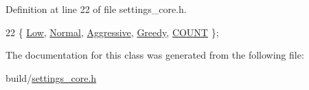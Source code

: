 Definition at line 22 of file settings\+\_\+core.\+h.


\begin{DoxyCode}
22 \{ \hyperlink{classOkular_1_1SettingsCore_1_1EnumMemoryLevel_a6dcad4c36c335a5cab78f24dd88090b4aa61e4f07eed0bf070a41fb0998e8c3b5}{Low}, \hyperlink{classOkular_1_1SettingsCore_1_1EnumMemoryLevel_a6dcad4c36c335a5cab78f24dd88090b4aab69bfc6de34e8bf9634a7586486296a}{Normal}, \hyperlink{classOkular_1_1SettingsCore_1_1EnumMemoryLevel_a6dcad4c36c335a5cab78f24dd88090b4a5f4aefbf160a235d1c3219eeca91f898}{Aggressive}, \hyperlink{classOkular_1_1SettingsCore_1_1EnumMemoryLevel_a6dcad4c36c335a5cab78f24dd88090b4a0c192fe00a744fb84cbc63d9431fbe2a}{Greedy}, \hyperlink{classOkular_1_1SettingsCore_1_1EnumMemoryLevel_a6dcad4c36c335a5cab78f24dd88090b4a9f4d6aa58e26f00075b19021d2590a40}{COUNT} \};
\end{DoxyCode}


The documentation for this class was generated from the following file\+:\begin{DoxyCompactItemize}
\item 
build/\hyperlink{settings__core_8h}{settings\+\_\+core.\+h}\end{DoxyCompactItemize}
